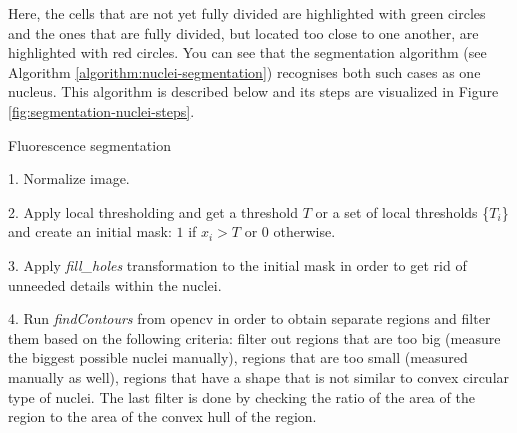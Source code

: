 Here, the cells that are not yet fully divided are highlighted with green circles and the ones that are fully divided, but located too close to one another, are highlighted with red circles. You can see that the segmentation algorithm (see Algorithm \ref{algorithm:nuclei-segmentation}) recognises both such cases as one nucleus. This algorithm is described below and its steps are visualized in Figure \ref{fig:segmentation-nuclei-steps}.
\begin{algorithm}
    \caption{Fluorescence segmentation}
    \begin{algorithmic}
    \item 1. Normalize image.
    \item 2. Apply local thresholding and get a threshold $T$ or a set of local thresholds \{$T_i$\} and create an initial mask: $1$ if $x_i > T$ or $0$ otherwise.
    \item 3. Apply \textit{fill\_holes} transformation to the initial mask in order to get rid of unneeded details within the nuclei.
    \item 4. Run \textit{findContours} from opencv in order to obtain separate regions and filter them based on the following criteria: filter out regions that are too big (measure the biggest possible nuclei manually), regions that are too small (measured manually as well), regions that have a shape that is not similar to convex circular type of nuclei. The last filter is done by checking the ratio of the area of the region to the area of the convex hull of the region.
    \end{algorithmic}
    \label{algorithm:nuclei-segmentation}
\end{algorithm}

